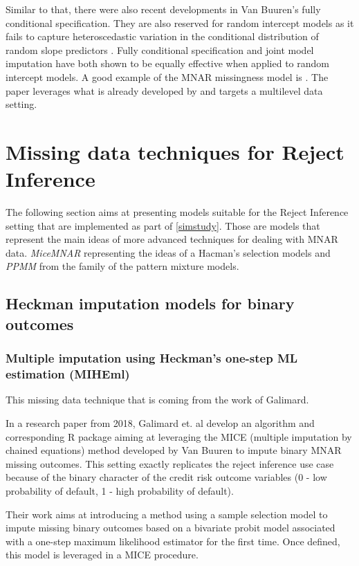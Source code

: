 \documentclass[11pt,a4paper]{article}
\begin{document}
Similar to that, there were also recent developments in Van Buuren’s fully conditional specification. They are also reserved for random intercept models as it fails to capture heteroscedastic variation in the conditional distribution of random slope predictors \cite{enders2020model}. Fully conditional specification and joint model imputation have both shown to be equally effective when applied to random intercept models. A good example of the MNAR missingness model is \cite{hammon_multiple_2020}. The paper leverages what is already developed by \cite{galimard_heckman_2018} and targets a multilevel data setting.


\section{Missing data techniques for Reject Inference}

The following section aims at presenting models suitable for the Reject Inference setting that are implemented as part of \ref{simstudy}. Those are models that represent the main ideas of more advanced techniques for dealing with MNAR data. \textit{MiceMNAR} representing the ideas of a Hacman's selection models and \textit{PPMM} from the family of the pattern mixture models. 

\subsection{Heckman imputation models for binary outcomes}

\subsubsection{Multiple imputation using Heckman's one-step ML estimation  (MIHEml)}


This missing data technique that is coming from the work of Galimard\cite{galimard_heckman_2018}. 

In a research paper from 2018\cite{galimard_heckman_2018}, Galimard et. al develop an algorithm and corresponding R package aiming at leveraging the MICE (multiple imputation by chained equations) method developed by Van Buuren\cite{van_buuren_multiple_2007} to impute binary MNAR missing outcomes. This setting exactly replicates the reject inference use case because of the binary character of the credit risk outcome variables (0 - low probability of default, 1 - high probability of default). 

Their work aims at introducing a method using a sample selection model to impute missing binary outcomes based on a bivariate probit model associated with a one-step maximum likelihood estimator for the first time. Once defined, this model is leveraged in a MICE procedure.
\end{document}
